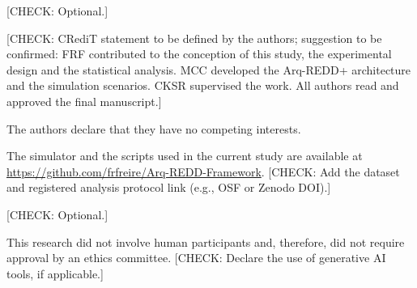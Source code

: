 \documentclass[english]{sbc2025}%
\newcommand{\chk}[1]{\textcolor{orange!80!black}{[CHECK: #1]}}
\begin{document}
\begin{declarations}

\begin{acknowledgements}
\chk{Optional.}
\end{acknowledgements}

\begin{contributions}
\chk{CRediT statement to be defined by the authors; suggestion to be confirmed: FRF contributed to the conception of this study, the experimental design and the statistical analysis. MCC developed the Arq-REDD+ architecture and the simulation scenarios. CKSR supervised the work. All authors read and approved the final manuscript.}
\end{contributions}

\begin{interests}
The authors declare that they have no competing interests.
\end{interests}

\begin{materials}
The simulator and the scripts used in the current study are available at \url{https://github.com/frfreire/Arq-REDD-Framework}. \chk{Add the dataset and registered analysis protocol link (e.g., OSF or Zenodo DOI).}
\end{materials}

\begin{funding}
\chk{Optional.}
\end{funding}

\begin{furtherinformation}
This research did not involve human participants and, therefore, did not require approval by an ethics committee. \chk{Declare the use of generative AI tools, if applicable.}
\end{furtherinformation}

\end{declarations}



\end{document}
